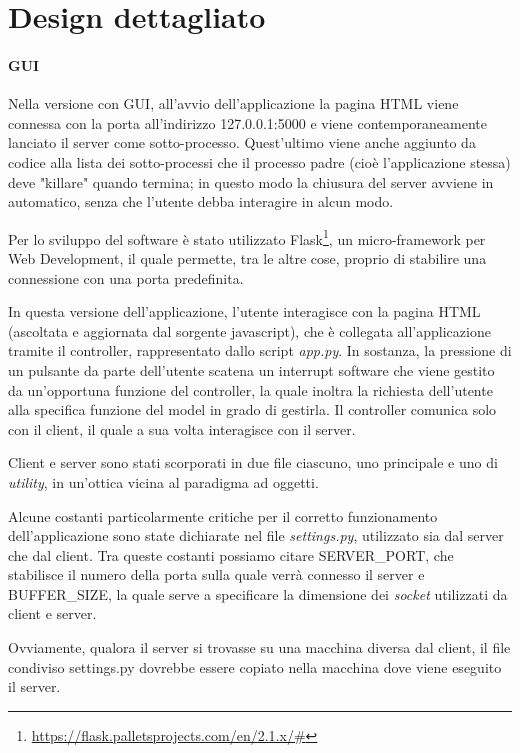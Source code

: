 \documentclass[a4paper,12pt]{report}
\begin{document}
\section{Design dettagliato}

\paragraph{GUI}
Nella versione con GUI, all'avvio dell'applicazione la pagina HTML viene connessa con la porta all'indirizzo 127.0.0.1:5000 e viene contemporaneamente lanciato il server come sotto-processo. Quest'ultimo viene anche aggiunto da codice alla lista dei sotto-processi che il processo padre (cioè l'applicazione stessa) deve "killare" quando termina; in questo modo la chiusura del server avviene in automatico, senza che l'utente debba interagire in alcun modo.

Per lo sviluppo del software è stato utilizzato Flask\footnote{\url{https://flask.palletsprojects.com/en/2.1.x/#}}, un micro-framework per Web Development, il quale permette, tra le altre cose, proprio di stabilire una connessione con una porta predefinita.

In questa versione dell'applicazione, l'utente interagisce con la pagina HTML (ascoltata e aggiornata dal sorgente javascript), che è collegata all'applicazione tramite il controller, rappresentato dallo script \textit{app.py}. In sostanza, la pressione di un pulsante da parte dell'utente scatena un interrupt software che viene gestito da un'opportuna funzione del controller, la quale inoltra la richiesta dell'utente alla specifica funzione del model in grado di gestirla. 
Il controller comunica solo con il client, il quale a sua volta interagisce con il server. 

Client e server sono stati scorporati in due file ciascuno, uno principale e uno di \textit{utility}, in un'ottica vicina al paradigma ad oggetti.

Alcune costanti particolarmente critiche per il corretto funzionamento dell'applicazione sono state dichiarate nel file \textit{settings.py}, utilizzato sia dal server che dal client. Tra queste costanti possiamo citare SERVER\_PORT, che stabilisce il numero della porta sulla quale verrà connesso il server e BUFFER\_SIZE, la quale serve a specificare la dimensione dei \textit{socket} utilizzati da client e server.

Ovviamente, qualora il server si trovasse su una macchina diversa dal client, il file condiviso settings.py dovrebbe essere copiato nella macchina dove viene eseguito il server.
\end{document}
